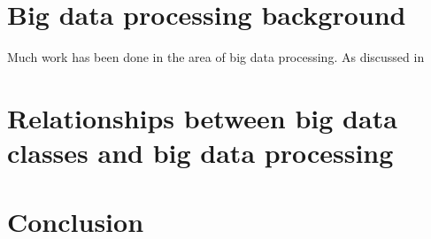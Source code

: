 \documentclass[a4paper,11pt]{article}
\begin{document}




\section{Big data processing background} %
\label{sec:big_data_processing_background}

Much work has been done in the area of big data processing. As discussed in



\section{Relationships between big data classes and big data processing} %
\label{sec:relationships_between_big_data_classes_and_big_data_processing}



\section{Conclusion} %
\label{sec:conclusion}


\newpage



\end{document}
